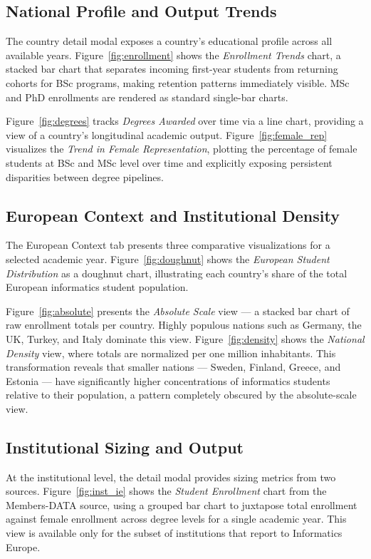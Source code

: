 \documentclass[final,3p,times,twocolumn]{elsarticle}
\begin{document}
\subsection{National Profile and Output Trends}

The country detail modal exposes a country's educational profile across all available years. Figure~\ref{fig:enrollment} shows the \textit{Enrollment Trends} chart, a stacked bar chart that separates incoming first-year students from returning cohorts for BSc programs, making retention patterns immediately visible. MSc and PhD enrollments are rendered as standard single-bar charts.

Figure~\ref{fig:degrees} tracks \textit{Degrees Awarded} over time via a line chart, providing a view of a country's longitudinal academic output. Figure~\ref{fig:female_rep} visualizes the \textit{Trend in Female Representation}, plotting the percentage of female students at BSc and MSc level over time and explicitly exposing persistent disparities between degree pipelines.

\subsection{European Context and Institutional Density}

The European Context tab presents three comparative visualizations for a selected academic year. Figure~\ref{fig:doughnut} shows the \textit{European Student Distribution} as a doughnut chart, illustrating each country's share of the total European informatics student population.

Figure~\ref{fig:absolute} presents the \textit{Absolute Scale} view — a stacked bar chart of raw enrollment totals per country. Highly populous nations such as Germany, the UK, Turkey, and Italy dominate this view. Figure~\ref{fig:density} shows the \textit{National Density} view, where totals are normalized per one million inhabitants. This transformation reveals that smaller nations --- Sweden, Finland, Greece, and Estonia --- have significantly higher concentrations of informatics students relative to their population, a pattern completely obscured by the absolute-scale view.

\subsection{Institutional Sizing and Output}

At the institutional level, the detail modal provides sizing metrics from two sources. Figure~\ref{fig:inst_ie} shows the \textit{Student Enrollment} chart from the Members-DATA source, using a grouped bar chart to juxtapose total enrollment against female enrollment across degree levels for a single academic year. This view is available only for the subset of institutions that report to Informatics Europe.
\end{document}
